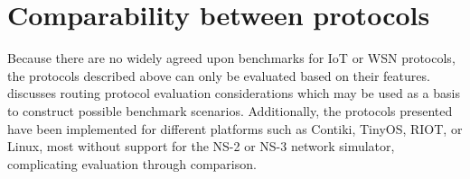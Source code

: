 \section{Comparability between protocols}
\label{subsec:comparability}
Because there are no widely agreed upon benchmarks for \gls{IoT} or \gls{WSN} protocols, the protocols described above can only be evaluated based on their features.
\cite{RFC2501} discusses routing protocol evaluation considerations which may be used as a basis to construct possible benchmark scenarios.
Additionally, the protocols presented have been implemented for different platforms such as Contiki, TinyOS, RIOT, or Linux, most without support for the NS-2 or NS-3 network simulator, complicating evaluation through comparison.
